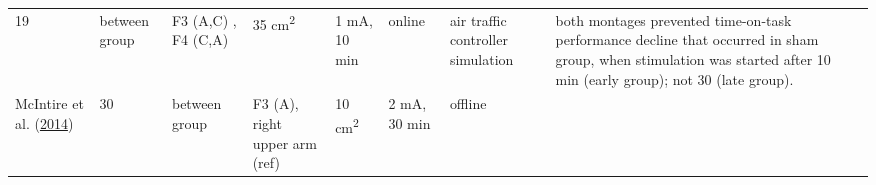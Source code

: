\documentclass[11pt,]{memoir}
\begin{document}
\begin{longtable}[]{@{}lllllllll@{}}
\begin{minipage}[t]{0.02\columnwidth}
19\strut
\end{minipage} & \begin{minipage}[t]{0.04\columnwidth}\raggedright
between
group\strut
\end{minipage} & \begin{minipage}[t]{0.10\columnwidth}\raggedright
F3 (A,C) , F4 (C,A)\strut
\end{minipage} & \begin{minipage}[t]{0.03\columnwidth}\raggedright
35
cm\textsuperscript{2}\strut
\end{minipage} & \begin{minipage}[t]{0.05\columnwidth}\raggedright
1 mA, 10
min\strut
\end{minipage} & \begin{minipage}[t]{0.06\columnwidth}\raggedright
online\strut
\end{minipage} & \begin{minipage}[t]{0.12\columnwidth}\raggedright
air traffic controller
simulation\strut
\end{minipage} & \begin{minipage}[t]{0.25\columnwidth}\raggedright
both montages prevented time-on-task performance
decline that occurred in sham group, when stimulation
was started after 10 min (early group); not 30 (late
group).\strut
\end{minipage}\tabularnewline
\begin{minipage}[t]{0.09\columnwidth}\raggedright
McIntire et al. (\protect\hyperlink{ref-McIntire2014}{2014})\strut
\end{minipage} & \begin{minipage}[t]{0.02\columnwidth}\raggedright
30\strut
\end{minipage} & \begin{minipage}[t]{0.04\columnwidth}\raggedright
between
group\strut
\end{minipage} & \begin{minipage}[t]{0.10\columnwidth}\raggedright
F3 (A), right upper
arm (ref)\strut
\end{minipage} & \begin{minipage}[t]{0.03\columnwidth}\raggedright
10
cm\textsuperscript{2}\strut
\end{minipage} & \begin{minipage}[t]{0.05\columnwidth}\raggedright
2 mA, 30
min\strut
\end{minipage} & \begin{minipage}[t]{0.06\columnwidth}\raggedright
offline\strut
\end{minipage} & \begin{minipage}[t]{0.12\columnwidth}\raggedright

\end{minipage}
\end{longtable}
\end{document}
